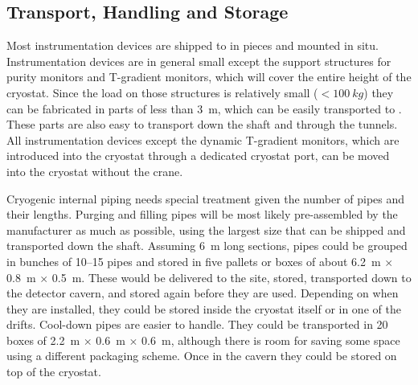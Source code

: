 \subsection{Transport, Handling and Storage}
\label{sec:fdgen-slow-cryo-install-transport}

Most instrumentation devices are shipped to \surf in pieces and mounted in situ. 
Instrumentation devices are in general small except the support structures for purity monitors and T-gradient monitors,
which will cover the entire height of the cryostat. Since the load on those structures is relatively small
 (\(<\SI{100}{kg}\)) they can be fabricated in parts of less than \SI{3}{m},
which can be easily transported to \surf. These parts are also easy to transport down the shaft and through the tunnels.
All instrumentation devices except the dynamic T-gradient monitors, which are introduced into the cryostat through a dedicated cryostat port, %
can be
moved into the cryostat without the crane.

Cryogenic internal piping needs special treatment given the number of pipes and their lengths.
Purging and filling pipes will be most likely pre-assembled by the manufacturer as much as possible, using the largest  
size that can be shipped and transported down the shaft. Assuming \SI{6}{m} long sections,
pipes could be grouped in bunches of \numrange{10}{15} pipes and stored in five pallets or boxes of about \SI{6.2}{m} $\times$ \SI{0.8}{m} $\times$ \SI{0.5}{m}. 
These would be delivered to the site, stored, transported down to the detector cavern,
 and stored again before they are used.
Depending on when they are installed, they could be stored inside the cryostat itself or in one of the drifts. 
Cool-down pipes are easier to handle. They could be transported in \num{20} boxes of \SI{2.2}{m} $\times$ \SI{0.6}{m} $\times$ \SI{0.6}{m}, although
there is room for saving some space using a different packaging scheme. 
Once in the cavern they could be stored on top of the cryostat.





